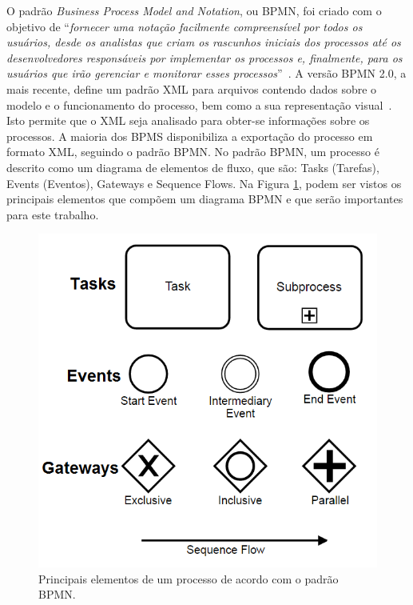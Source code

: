 \documentclass[12pt]{article}
\begin{document}

O padrão \emph{Business Process Model and Notation}, ou BPMN, foi criado com o objetivo de ``\emph{fornecer uma notação facilmente compreensível por todos os usuários, desde os analistas que criam os rascunhos iniciais dos processos até os desenvolvedores responsáveis por implementar os processos e, finalmente, para os usuários que irão gerenciar e monitorar esses processos}''~\cite{model2011notation}. A versão BPMN 2.0, a mais recente, define um padrão XML para arquivos contendo dados sobre o modelo e o funcionamento do processo, bem como a sua representação visual~\cite{Kurz:2016}. Isto permite que o XML seja analisado para obter-se informações sobre os processos. A maioria dos BPMS disponibiliza a exportação do processo em formato XML, seguindo o padrão BPMN. No padrão BPMN, um processo é descrito como um diagrama de elementos de fluxo, que são: Tasks (Tarefas), Events (Eventos), Gateways e Sequence Flows. Na Figura \ref{fig:bpmn}, podem ser vistos os principais elementos que compõem um diagrama BPMN e que serão importantes para este trabalho.

\begin{figure}[ht]
\centering
\includegraphics[width=.5\textwidth]{figuras/newbpmn.png}
\caption{Principais elementos de um processo de acordo com o padrão BPMN.}
\label{fig:bpmn}
\end{figure}
\end{document}

